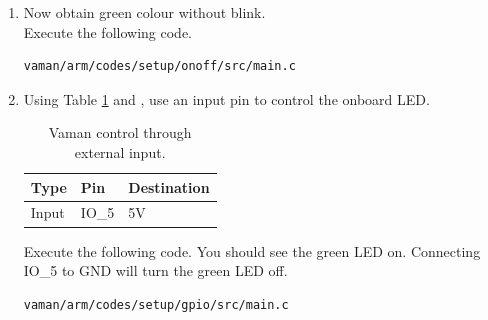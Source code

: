 \begin{enumerate}[label=\arabic*.,ref=\theenumi]
\item Now obtain green colour without blink.
\\
\solution Execute the following code.
\begin{lstlisting}
vaman/arm/codes/setup/onoff/src/main.c
\end{lstlisting}
%
\item  Using Table  \ref{tab:vaman/arm/setup/input} and 
,
 use an input pin to control the onboard LED.  

\begin{table}[]
\centering
\begin{tabular}{|l|l|l|}
\hline
Type & Pin  &  Destination\\ \hline
Input &  IO\_5 &  5V\\ \hline
\end{tabular}
\caption{Vaman control through external input.}
\label{tab:vaman/arm/setup/input}
\end{table}

\solution Execute the following code.  You should see the green LED on.   Connecting IO\_5 to GND will turn the green LED off.
\begin{lstlisting}
vaman/arm/codes/setup/gpio/src/main.c
\end{lstlisting}

\end{enumerate}


